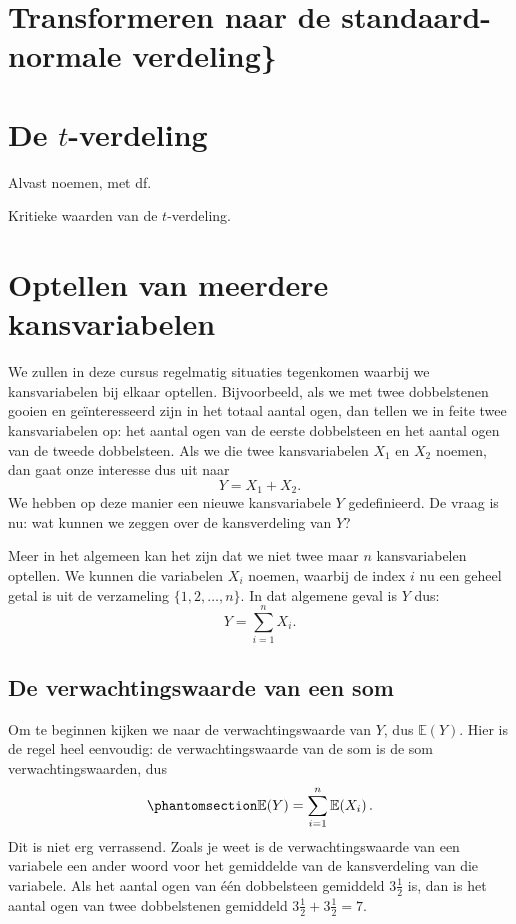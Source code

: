 \documentclass[
  a4paper,
]{scrbook}
\theoremstyle{definition}
\theoremstyle{definition}
\theoremstyle{remark}
\begin{document}
\section{Transformeren naar de standaard-normale
verdeling\}}\label{transformeren-naar-de-standaard-normale-verdeling}

\section{\texorpdfstring{De
\(t\)-verdeling}{De t-verdeling}}\label{de-t-verdeling}

Alvast noemen, met df.

Kritieke waarden van de \(t\)-verdeling.

\section{Optellen van meerdere
kansvariabelen}\label{optellen-van-meerdere-kansvariabelen}

We zullen in deze cursus regelmatig situaties tegenkomen waarbij we
kansvariabelen bij elkaar optellen. Bijvoorbeeld, als we met twee
dobbelstenen gooien en geïnteresseerd zijn in het totaal aantal ogen,
dan tellen we in feite twee kansvariabelen op: het aantal ogen van de
eerste dobbelsteen en het aantal ogen van de tweede dobbelsteen. Als we
die twee kansvariabelen \(X_1\) en \(X_2\) noemen, dan gaat onze
interesse dus uit naar \[ Y = X_1 + X_2.\] We hebben op deze manier een
nieuwe kansvariabele \(Y\) gedefinieerd. De vraag is nu: wat kunnen we
zeggen over de kansverdeling van \(Y\)?

Meer in het algemeen kan het zijn dat we niet twee maar \(n\)
kansvariabelen optellen. We kunnen die variabelen \(X_i\) noemen,
waarbij de index \(i\) nu een geheel getal is uit de verzameling
\(\{1, 2, \dots, n\}\). In dat algemene geval is \(Y\) dus:
\[ Y = \sum_{i=1}^n X_i.\]

\subsection{De verwachtingswaarde van een
som}\label{de-verwachtingswaarde-van-een-som}

Om te beginnen kijken we naar de verwachtingswaarde van \(Y\), dus
\(\mathbb{E}\!\left(Y\right)\). Hier is de regel heel eenvoudig: de
verwachtingswaarde van de som is de som verwachtingswaarden, dus
\begin{equation}\phantomsection\label{eq-evsom}{
\mathbb{E}\!\left(Y\right) = \sum_{i = 1}^n \mathbb{E}\!\left(X_i\right).
}\end{equation} Dit is niet erg verrassend. Zoals je weet is de
verwachtingswaarde van een variabele een ander woord voor het gemiddelde
van de kansverdeling van die variabele. Als het aantal ogen van één
dobbelsteen gemiddeld \(3 \frac{1}{2}\) is, dan is het aantal ogen van
twee dobbelstenen gemiddeld \(3 \frac{1}{2} + 3 \frac{1}{2} = 7\).
\end{document}
